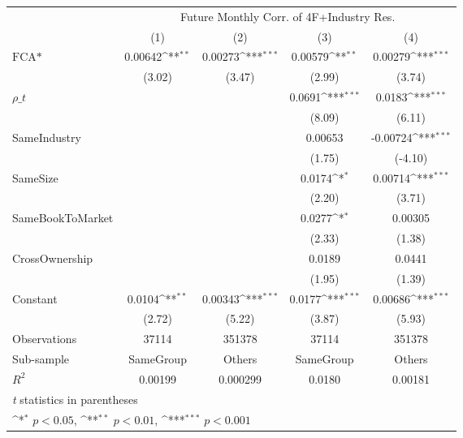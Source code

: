 {
\def\sym#1{\ifmmode^{#1}\else\(^{#1}\)\fi}
\begin{tabular}{l*{4}{c}}
\hline\hline
                &\multicolumn{4}{c}{Future Monthly Corr. of 4F+Industry Res.}               \\\cmidrule(lr){2-5}
                &\multicolumn{1}{c}{(1)}         &\multicolumn{1}{c}{(2)}         &\multicolumn{1}{c}{(3)}         &\multicolumn{1}{c}{(4)}         \\
\hline
$ \text{FCA*} $ &  0.00642\sym{**} &  0.00273\sym{***}&  0.00579\sym{**} &  0.00279\sym{***}\\
                &   (3.02)         &   (3.47)         &   (2.99)         &   (3.74)         \\
[1em]
 $ {\rho\_t} $   &                  &                  &   0.0691\sym{***}&   0.0183\sym{***}\\
                &                  &                  &   (8.09)         &   (6.11)         \\
[1em]
SameIndustry    &                  &                  &  0.00653         & -0.00724\sym{***}\\
                &                  &                  &   (1.75)         &  (-4.10)         \\
[1em]
SameSize        &                  &                  &   0.0174\sym{*}  &  0.00714\sym{***}\\
                &                  &                  &   (2.20)         &   (3.71)         \\
[1em]
SameBookToMarket&                  &                  &   0.0277\sym{*}  &  0.00305         \\
                &                  &                  &   (2.33)         &   (1.38)         \\
[1em]
CrossOwnership  &                  &                  &   0.0189         &   0.0441         \\
                &                  &                  &   (1.95)         &   (1.39)         \\
[1em]
Constant        &   0.0104\sym{**} &  0.00343\sym{***}&   0.0177\sym{***}&  0.00686\sym{***}\\
                &   (2.72)         &   (5.22)         &   (3.87)         &   (5.93)         \\
\hline
Observations    &    37114         &   351378         &    37114         &   351378         \\
Sub-sample      &SameGroup         &   Others         &SameGroup         &   Others         \\
$ R^2 $         &  0.00199         & 0.000299         &   0.0180         &  0.00181         \\
\hline\hline
\multicolumn{5}{l}{\footnotesize \textit{t} statistics in parentheses}\\
\multicolumn{5}{l}{\footnotesize \sym{*} \(p<0.05\), \sym{**} \(p<0.01\), \sym{***} \(p<0.001\)}\\
\end{tabular}
}
